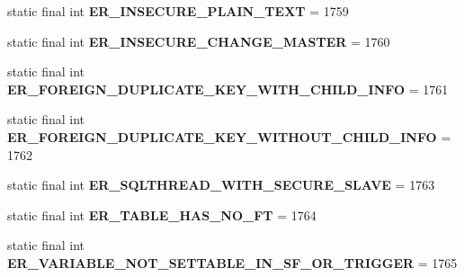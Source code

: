 \begin{DoxyCompactItemize}
static final int {\bfseries E\+R\+\_\+\+I\+N\+S\+E\+C\+U\+R\+E\+\_\+\+P\+L\+A\+I\+N\+\_\+\+T\+E\+XT} = 1759
\item 
\mbox{\label{classcom_1_1mysql_1_1cj_1_1exceptions_1_1_mysql_error_numbers_a6616e23ce6697aa5a2da6305c7a494a3}} 
static final int {\bfseries E\+R\+\_\+\+I\+N\+S\+E\+C\+U\+R\+E\+\_\+\+C\+H\+A\+N\+G\+E\+\_\+\+M\+A\+S\+T\+ER} = 1760
\item 
\mbox{\label{classcom_1_1mysql_1_1cj_1_1exceptions_1_1_mysql_error_numbers_a8bab28d2d881327adfaaa25b640cc1f2}} 
static final int {\bfseries E\+R\+\_\+\+F\+O\+R\+E\+I\+G\+N\+\_\+\+D\+U\+P\+L\+I\+C\+A\+T\+E\+\_\+\+K\+E\+Y\+\_\+\+W\+I\+T\+H\+\_\+\+C\+H\+I\+L\+D\+\_\+\+I\+N\+FO} = 1761
\item 
\mbox{\label{classcom_1_1mysql_1_1cj_1_1exceptions_1_1_mysql_error_numbers_a1e6446a313624a59e1a9368c48c6c092}} 
static final int {\bfseries E\+R\+\_\+\+F\+O\+R\+E\+I\+G\+N\+\_\+\+D\+U\+P\+L\+I\+C\+A\+T\+E\+\_\+\+K\+E\+Y\+\_\+\+W\+I\+T\+H\+O\+U\+T\+\_\+\+C\+H\+I\+L\+D\+\_\+\+I\+N\+FO} = 1762
\item 
\mbox{\label{classcom_1_1mysql_1_1cj_1_1exceptions_1_1_mysql_error_numbers_a1319d4cb6254ad08527ba5a86ba67426}} 
static final int {\bfseries E\+R\+\_\+\+S\+Q\+L\+T\+H\+R\+E\+A\+D\+\_\+\+W\+I\+T\+H\+\_\+\+S\+E\+C\+U\+R\+E\+\_\+\+S\+L\+A\+VE} = 1763
\item 
\mbox{\label{classcom_1_1mysql_1_1cj_1_1exceptions_1_1_mysql_error_numbers_afd57ab528d669db2fe500a142375bb0b}} 
static final int {\bfseries E\+R\+\_\+\+T\+A\+B\+L\+E\+\_\+\+H\+A\+S\+\_\+\+N\+O\+\_\+\+FT} = 1764
\item 
\mbox{\label{classcom_1_1mysql_1_1cj_1_1exceptions_1_1_mysql_error_numbers_a2619a73ef893e0bd8d50c2b2149576ca}} 
static final int {\bfseries E\+R\+\_\+\+V\+A\+R\+I\+A\+B\+L\+E\+\_\+\+N\+O\+T\+\_\+\+S\+E\+T\+T\+A\+B\+L\+E\+\_\+\+I\+N\+\_\+\+S\+F\+\_\+\+O\+R\+\_\+\+T\+R\+I\+G\+G\+ER} = 1765
\item 

\end{DoxyCompactItemize}

